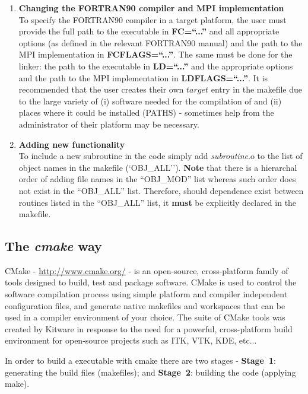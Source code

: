 \begin{enumerate}
\item {\bf Changing the FORTRAN90 compiler and MPI implementation} \\
To specify the FORTRAN90 compiler in a target platform, the user
must provide the full path to the executable in {\bf FC=``...''} and
all appropriate options (as defined in the relevant
FORTRAN90 manual) and the path to the MPI
implementation in {\bf FCFLAGS=``...''}.  The same must be done
for the linker: the path to the executable in {\bf LD=``...''}
and the appropriate options and the path to the MPI implementation
in {\bf LDFLAGS=``...''}.  It is recommended that the user creates
their own $target$ entry in the makefile due to the large variety of
(i) software needed for the compilation of \D and (ii) places where
it could be installed (PATHS) - sometimes help from the administrator
of their platform may be necessary. \\

\item {\bf Adding new functionality} \\
To include a new subroutine in the code simply add {\em subroutine}.o
to the list of object names in the makefile (`OBJ\_ALL'').  {\bf Note}
that there is a hierarchal order of adding file names in the ``OBJ\_MOD''
list whereas such order does not exist in the ``OBJ\_ALL'' list.
Therefore, should dependence exist between routines listed in the
``OBJ\_ALL'' list, it {\bf must} be explicitly declared in the makefile.
\end{enumerate}

\subsection{The {\sl cmake} way}
\label{cmake}

CMake - \href{http://www.cmake.org/}{http://www.cmake.org/} - is
an open-source, cross-platform family of tools designed to build, test
and package software.  CMake is used to control the software compilation
process using simple platform and compiler independent configuration files,
and generate native makefiles and workspaces that can be used in a
compiler environment of your choice.  The suite of CMake tools was
created by Kitware in response to the need for a powerful, cross-platform
build environment for open-source projects such as ITK, VTK, KDE, etc...

In order to build a \D executable with cmake there are two stages -
{\bf Stage~1}: generating the build files (makefiles); and
{\bf Stage~2}: building the code (applying make).

